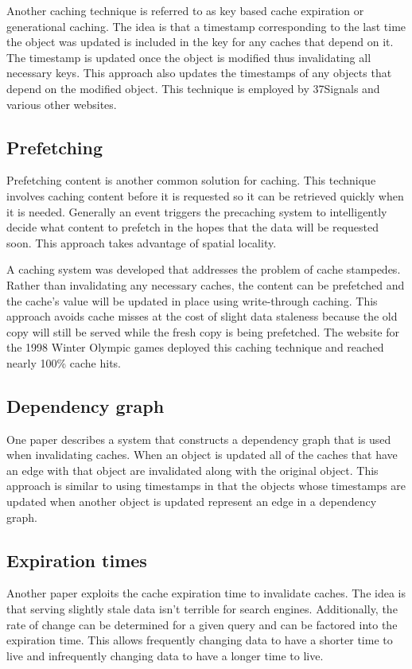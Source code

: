 \documentclass[12pt]{article}
\begin{document}
Another caching technique is referred to as key based cache expiration\cite{keyBasedCacheExpiration} or generational caching\cite{generationalCaching}.
The idea is that a timestamp corresponding to the last time the object was updated is included in the key for any caches that depend on it.
The timestamp is updated once the object is modified thus invalidating all necessary keys.
This approach also updates the timestamps of any objects that depend on the modified object.
This technique is employed by 37Signals and various other websites.\cite{keyBasedCacheExpiration}

\subsection{Prefetching}
Prefetching content is another common solution for caching.
This technique involves caching content before it is requested so it can be retrieved quickly when it is needed.
Generally an event triggers the precaching system to intelligently decide what content to prefetch in the hopes that the data will be requested soon.
This approach takes advantage of spatial locality.

A caching system was developed that addresses the problem of cache stampedes.\cite{scalableConsistentCaching}
Rather than invalidating any necessary caches, the content can be prefetched and the cache's value will be updated in place using write-through caching.
This approach avoids cache misses at the cost of slight data staleness because the old copy will still be served while the fresh copy is being prefetched.
The website for the 1998 Winter Olympic games deployed this caching technique and reached nearly 100\% cache hits.\cite{scalableConsistentCaching}

\subsection{Dependency graph}
One paper describes a system that constructs a dependency graph that is used when invalidating caches.\cite{scalableConsistentCaching}
When an object is updated all of the caches that have an edge with that object are invalidated along with the original object.
This approach is similar to using timestamps in that the objects whose timestamps are updated when another object is updated represent an edge in a dependency graph.

\subsection{Expiration times}
Another paper exploits the cache expiration time to invalidate caches.\cite{refreshingPerspectiveSearch}
The idea is that serving slightly stale data isn't terrible for search engines.
Additionally, the rate of change can be determined for a given query and can be factored into the expiration time.
This allows frequently changing data to have a shorter time to live and infrequently changing data to have a longer time to live.
\end{document}

